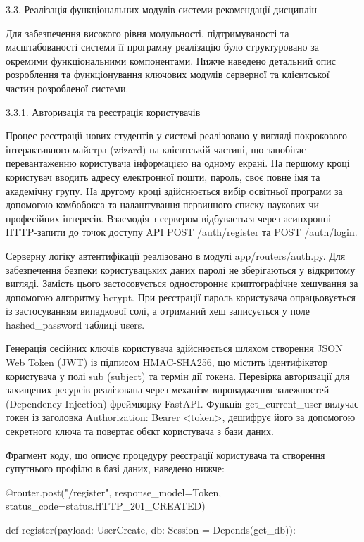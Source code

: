 \documentclass[
]{article}
\begin{document}
\protect{}\label{_Toc230434098}{}3.3. Реалізація
функціональних модулів системи рекомендації дисциплін

Для забезпечення високого рівня модульності, підтримуваності та
масштабованості системи її програмну реалізацію було структуровано за
окремими функціональними компонентами. Нижче наведено детальний опис
розроблення та функціонування ключових модулів серверної та клієнтської
частин розробленої системи.

3.3.1. Авторизація та реєстрація користувачів

Процес реєстрації нових студентів у системі реалізовано у вигляді
покрокового інтерактивного майстра (wizard) на клієнтській частині, що
запобігає перевантаженню користувача інформацією на одному екрані. На
першому кроці користувач вводить адресу електронної пошти, пароль, своє
повне ім\textquotesingle я та академічну групу. На другому кроці
здійснюється вибір освітньої програми за допомогою комбобокса та
налаштування первинного списку наукових чи професійних інтересів.
Взаємодія з сервером відбувається через асинхронні HTTP-запити до точок
доступу API POST /auth/register та POST /auth/login.

Серверну логіку автентифікації реалізовано в модулі app/routers/auth.py.
Для забезпечення безпеки користувацьких даних паролі не зберігаються у
відкритому вигляді. Замість цього застосовується одностороннє
криптографічне хешування за допомогою алгоритму bcrypt. При реєстрації
пароль користувача опрацьовується із застосуванням випадкової солі, а
отриманий хеш записується у поле hashed\_password таблиці users.

Генерація сесійних ключів користувача здійснюється шляхом створення JSON
Web Token (JWT) із підписом HMAC-SHA256, що містить ідентифікатор
користувача у полі sub (subject) та термін дії токена. Перевірка
авторизації для захищених ресурсів реалізована через механізм
впровадження залежностей (Dependency Injection) фреймворку FastAPI.
Функція get\_current\_user вилучає токен із заголовка Authorization:
Bearer \textless token\textgreater, дешифрує його за допомогою
секретного ключа та повертає об\textquotesingle єкт користувача з бази
даних.

Фрагмент коду, що описує процедуру реєстрації користувача та створення
супутнього профілю в базі даних, наведено нижче:

@router.post("/register", response\_model=Token,
status\_code=status.HTTP\_201\_CREATED)

def register(payload: UserCreate, db: Session = Depends(get\_db)):
\end{document}
